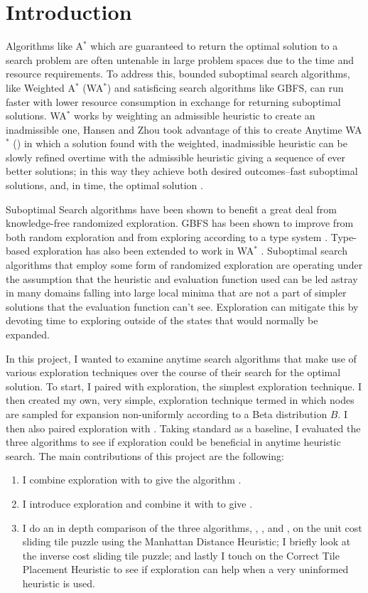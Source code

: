 \section{Introduction}
Algorithms like A$^*$ which are guaranteed to return the optimal solution to a search problem are often untenable in large problem spaces due to the time and resource requirements. To address this, bounded suboptimal search algorithms, like Weighted A$^*$ (WA$^*$) and satisficing search algorithms like GBFS, can run faster with lower resource consumption in exchange for returning suboptimal solutions. WA$^*$ works by weighting an admissible heuristic to create an inadmissible one, Hansen and Zhou took advantage of this to create Anytime WA$^*$ (\awa) in which a solution found with the weighted, inadmissible heuristic can be slowly refined overtime with the admissible heuristic giving a sequence of ever better solutions; in this way they achieve both desired outcomes--fast suboptimal solutions, and, in time, the optimal solution \cite{hansen2007anytime}.  

Suboptimal Search algorithms have been shown to benefit a great deal from knowledge-free randomized exploration. GBFS has been shown to improve from both random exploration and from exploring according to a type system \cite{valenzano2014comparison}\cite{xie2014type}. Type-based exploration has also been extended to work in WA$^*$ \cite{cohen2021type}. Suboptimal search algorithms that employ some form of randomized exploration are operating under the assumption that the heuristic and evaluation function used can be led astray in many domains falling into large local minima that are not a part of simpler solutions that the evaluation function can't see. Exploration can mitigate this by devoting time to exploring outside of the states that would normally be expanded.

In this project, I wanted to examine anytime search algorithms that make use of various exploration techniques over the course of their search for the optimal solution. To start, I paired \awa with \egreedy exploration, the simplest exploration technique. I then created my own, very simple, exploration technique termed \ebgreedy in which nodes are sampled for expansion non-uniformly according to a Beta distribution $B$. I then also paired \ebgreedy exploration with \awa. Taking standard \awa as a baseline, I evaluated the three algorithms to see if exploration could be beneficial in anytime heuristic search. The main contributions of this project are the following:
\begin{enumerate}
    \item I combine \egreedy exploration with \awa to give the algorithm \eawa.
    \item I introduce \ebgreedy exploration and combine it with \awa to give \ebawa.
    \item I do an in depth comparison of the three algorithms, \awa, \eawa, and \ebawa, on the unit cost sliding tile puzzle using the Manhattan Distance Heuristic; I briefly look at the inverse cost sliding tile puzzle; and lastly I touch on the Correct Tile Placement Heuristic to see if exploration can help when a very uninformed heuristic is used. 
\end{enumerate}

